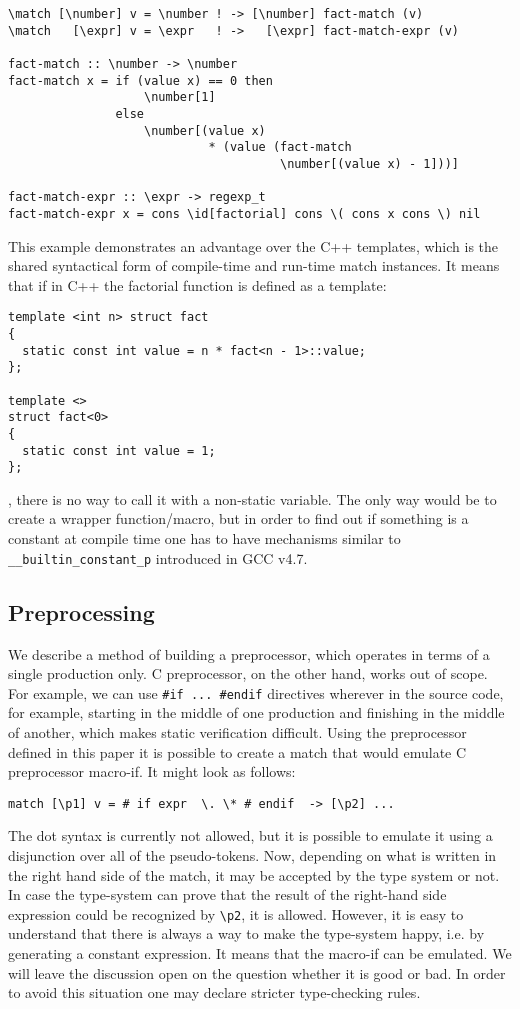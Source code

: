 \begin{verbatim}
\match [\number] v = \number ! -> [\number] fact-match (v)
\match   [\expr] v = \expr   ! ->   [\expr] fact-match-expr (v)

fact-match :: \number -> \number
fact-match x = if (value x) == 0 then
                   \number[1]
               else
                   \number[(value x) 
                            * (value (fact-match 
                                      \number[(value x) - 1]))]

fact-match-expr :: \expr -> regexp_t
fact-match-expr x = cons \id[factorial] cons \( cons x cons \) nil
\end{verbatim}

This example demonstrates an advantage over the C++ templates, which
is the shared syntactical form of compile-time and run-time match instances.
It means that if in C++ the factorial function is defined as a template:
\begin{verbatim}
template <int n> struct fact 
{
  static const int value = n * fact<n - 1>::value;
};
 
template <>
struct fact<0> 
{
  static const int value = 1;
};
\end{verbatim}
, there is no way to call it with a non-static variable.  The only way 
would be to create a wrapper function/macro, but in order to find out
if something is a constant at compile time one has to have mechanisms
similar to \verb|__builtin_constant_p| introduced in GCC v4.7.

\subsection{Preprocessing}
We describe a method of building a preprocessor, which operates in terms of a
single production only.  C preprocessor, on the other hand, works out of scope.
For example, we can use \verb|#if ... #endif| directives wherever in the
source code, for example, starting in the middle of one production and
finishing in the middle of another, which makes static verification difficult.
Using the preprocessor defined in this paper it is possible to create a match
that would emulate C preprocessor macro-if.  It might look as follows:
\begin{verbatim}
match [\p1] v = # if expr  \. \* # endif  -> [\p2] ...
\end{verbatim}
The dot syntax is currently not allowed, but it is possible to emulate it using
a disjunction over all of the pseudo-tokens.  Now, depending on what is written
in the right hand side of the match, it may be accepted by the type system or
not.  In case the type-system can prove that the result of the right-hand side
expression could be recognized by \verb|\p2|, it is allowed.  However, it is
easy to understand that there is always a way to make the type-system happy,
i.e. by generating a constant expression.  It means that the macro-if can be
emulated.  We will leave the discussion open on the question whether it is good
or bad.  In order to avoid this situation one may declare stricter
type-checking rules.
